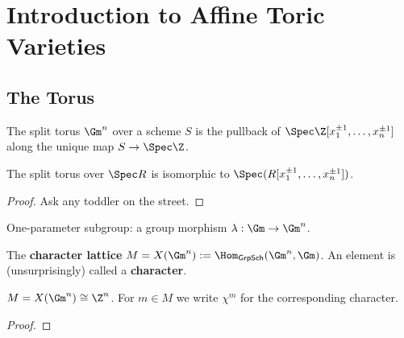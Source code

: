 \section{Introduction to Affine Toric Varieties}


\subsection{The Torus}


\begin{definition}
  \label{1-1-torus}
  \leanok

  The split torus $\Gm^n$ over a scheme $S$ is the pullback of $\Spec \Z[x_1^{\pm 1}, \dotsc, x_n^{\pm 1}]$ along the unique map $S \to \Spec \Z$.
\end{definition}


\begin{lemma}
  \label{1-1-torus-spec}
  \leanok

  The split torus over $\Spec R$ is isomorphic to $\Spec(R[x_1^{\pm 1}, \dotsc, x_n^{\pm 1}])$.
\end{lemma}
\begin{proof}
  \uses{}

  Ask any toddler on the street.
\end{proof}


\begin{definition}
  \label{1-1-cochar}
  \leanok

  One-parameter subgroup: a group morphism $\lambda : \Gm \to \Gm^n$.
\end{definition}


\begin{definition}
  \label{1-1-char}
  \leanok

  The {\bf character lattice} $M = X(\Gm^n) := \Hom_{\mathsf{GrpSch}}(\Gm^n, \Gm)$.
  An element is (unsurprisingly) called a {\bf character}.
\end{definition}


\begin{proposition}
  \label{1-1-char-torus}

  $M = X(\Gm^n) \cong \Z^n$. For $m \in M$ we write $\chi^m$ for the corresponding character.
\end{proposition}
\begin{proof}

\end{proof}


